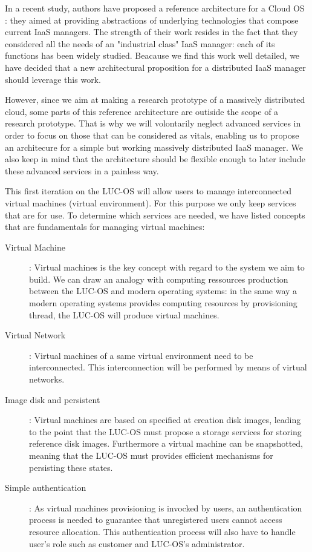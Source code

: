 In a recent study, authors have proposed a reference architecture for 
a Cloud OS \cite{moreno2012iaas}: they aimed at providing abstractions of 
underlying technologies that compose current IaaS managers. The strength of 
their work resides in the fact that they considered all the needs of an 
"industrial class" IaaS manager: each of its functions has been widely studied.
Beacause we find this work well detailed, we have decided that a new 
architectural proposition for a distributed IaaS manager should leverage this 
work.

However, since we aim at making a research prototype of a massively distributed
cloud, some parts of this reference architecture are outiside the scope of a 
research prototype. That is why we will volontarily neglect advanced services in
order to focus on those that can be considered as vitals, enabling us to propose
an architecure for a simple but working massively distributed IaaS manager. We 
also keep in mind that the architecture should be flexible enough to later 
include these advanced services in a painless way.

This first iteration on the LUC-OS will allow users to manage interconnected 
virtual machines (virtual environment). For this purpose we only keep services 
that are for use. To determine which services are needed, we
have listed concepts that are fundamentals for managing virtual machines:

\label{cloud_os_concepts}

\begin{description}

	\item [Virtual Machine] : Virtual machines is the key concept with regard to
	the system we aim to build. We can draw an analogy with computing ressources
	production between the LUC-OS and modern operating systems: in the same way 
	a modern  operating systems provides computing resources by provisioning 
	thread, the LUC-OS will produce virtual machines.

	\item [Virtual Network] : Virtual machines of a same virtual 
	environment need to be interconnected. This interconnection will be
	performed by means of virtual networks.

	\item [Image disk and persistent] : Virtual machines are based on 
	specified at creation disk images, leading to the point that the LUC-OS must
	propose a storage services for storing reference disk images. Furthermore a 
	virtual machine can be snapshotted, meaning that the LUC-OS must provides 
	efficient mechanisms for persisting these states.

	\item [Simple authentication] : As virtual machines provisioning is
	invocked by users, an authentication process is needed to guarantee that
	unregistered users cannot access resource allocation. This authentication 
	process will also have to handle user's role such as customer and LUC-OS's
	administrator.

\end{description}





